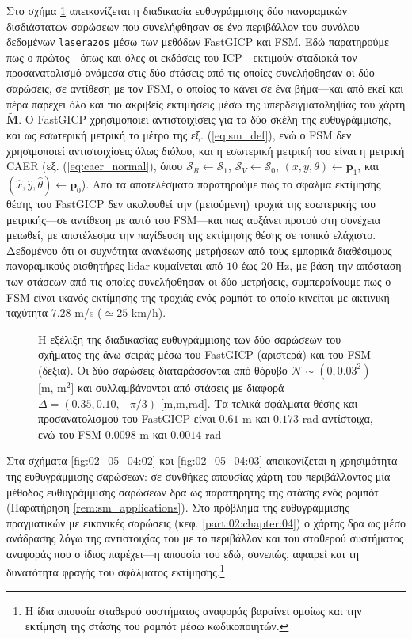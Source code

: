Στο σχήμα \ref{fig:02_05_04:01} απεικονίζεται η διαδικασία ευθυγράμμισης δύο
πανοραμικών δισδιάστατων σαρώσεων που συνελήφθησαν σε ένα περιβάλλον του συνόλου
δεδομένων \texttt{laserazos} μέσω των μεθόδων FastGICP
και FSM.  Εδώ παρατηρούμε πως ο πρώτος---όπως και όλες οι εκδόσεις του
ICP---εκτιμούν σταδιακά τον προσανατολισμό ανάμεσα στις δύο στάσεις από τις
οποίες συνελήφθησαν οι δύο σαρώσεις, σε αντίθεση με τον FSM, ο οποίος το κάνει
σε ένα βήμα---και από εκεί και πέρα παρέχει όλο και πιο ακριβείς εκτιμήσεις μέσω
της υπερδειγματοληψίας του χάρτη $\widetilde{\bm{M}}$. Ο FastGICP χρησιμοποιεί
αντιστοιχίσεις για τα δύο σκέλη της ευθυγράμμισης, και ως εσωτερική μετρική το
μέτρο της εξ. (\ref{eq:sm_def}), ενώ ο FSM δεν χρησιμοποιεί αντιστοιχίσεις
όλως διόλου, και η εσωτερική μετρική του είναι η μετρική CAER (εξ.
(\ref{eq:caer_normal}), όπου $\mathcal{S}_R \leftarrow \mathcal{S}_1$,
$\mathcal{S}_V \leftarrow \mathcal{S}_0$, $(x,y,\theta)\leftarrow\bm{p}_1$, και
$(\hat{x}, \hat{y}, \hat{\theta}) \leftarrow \bm{p}_0$). Από τα αποτελέσματα
παρατηρούμε πως το σφάλμα εκτίμησης θέσης του FastGICP δεν ακολουθεί την
(μειούμενη) τροχιά της εσωτερικής του μετρικής---σε αντίθεση με αυτό του
FSM---και πως αυξάνει προτού στη συνέχεια μειωθεί, με αποτέλεσμα την
παγίδευση της εκτίμησης θέσης σε τοπικό ελάχιστο. Δεδομένου ότι οι συχνότητα
ανανέωσης μετρήσεων από τους εμπορικά διαθέσιμους πανοραμικούς αισθητήρες lidar
κυμαίνεται από $10$ έως $20$ Hz, με βάση την απόσταση των στάσεων από τις οποίες
συνελήφθησαν οι δύο μετρήσεις, συμπεραίνουμε πως ο FSM είναι ικανός εκτίμησης
της τροχιάς ενός ρομπότ το οποίο κινείται με ακτινική ταχύτητα $7.28$ m/s
($\simeq 25$ km/h).

\begin{figure}[]\centering
  
  \vspace{0.5cm}
  \caption{\small Η εξέλιξη της διαδικασίας ευθυγράμμισης των δύο σαρώσεων του
           σχήματος της άνω σειράς μέσω του FastGICP (αριστερά) και του
           FSM (δεξιά). Οι δύο σαρώσεις διαταράσσονται από θόρυβο
           $\mathcal{N} \sim (0, 0.03^2)$ [m, m$^2$] και συλλαμβάνονται από
           στάσεις με διαφορά $\Delta = (0.35, 0.10, -\pi/3)$ [m,m,rad].
           Τα τελικά σφάλματα θέσης και προσανατολισμού του FastGICP είναι
           $0.61$ m και $0.173$ rad αντίστοιχα, ενώ του FSM
           $0.0098$ m και $0.0014$ rad}
  \label{fig:02_05_04:01}
\end{figure}


Στα σχήματα \ref{fig:02_05_04:02} και \ref{fig:02_05_04:03} απεικονίζεται η
χρησιμότητα της ευθυγράμμισης σαρώσεων: σε συνθήκες απουσίας χάρτη του
περιβάλλοντος μία μέθοδος ευθυγράμμισης σαρώσεων δρα ως παρατηρητής της στάσης
ενός ρομπότ (Παρατήρηση \ref{rem:sm_applications}). Στο πρόβλημα της
ευθυγράμμισης πραγματικών με εικονικές σαρώσεις (κεφ. \ref{part:02:chapter:04})
ο χάρτης δρα ως μέσο ανάδρασης λόγω της αντιστοιχίας του με το περιβάλλον και
του σταθερού συστήματος αναφοράς που ο ίδιος παρέχει---η απουσία του εδώ,
συνεπώς, αφαιρεί και τη δυνατότητα φραγής του σφάλματος εκτίμησης.\footnote{Η
ίδια απουσία σταθερού συστήματος αναφοράς βαραίνει ομοίως και την εκτίμηση της
στάσης του ρομπότ μέσω κωδικοποιητών.}

